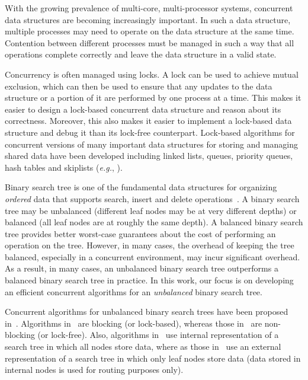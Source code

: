 With the growing prevalence of multi-core, multi-processor systems, concurrent data structures are becoming increasingly important. In such a data structure, multiple processes may need to operate on the data structure at the same time. Contention between different processes must be managed in such a way that all operations complete correctly and leave the data structure in a valid state.

Concurrency is often managed using locks. A lock can be used to achieve mutual exclusion, which can then be used to ensure that any updates to the data structure or a portion of it are performed by one process at a time. This makes it easier to design a lock-based concurrent data structure and reason about its correctness. Moreover, this also makes it easier to implement a lock-based data structure and debug it than its lock-free counterpart. Lock-based algorithms for concurrent versions of many important data structures for storing and managing shared data have been developed including linked lists, queues, priority queues, hash tables and skiplists (\emph{e.g.}, \cite{MicSco:1996:PODC, Mic:2002:SPAA,Lea:2003:JSR166,HelHer+:2005:OPODIS,LevHer+:2007:SIROCCO, HerSha:2012:Book}).

Binary search tree is one of the fundamental data structures for organizing \emph{ordered} data that supports search, insert and delete operations~\cite{CorLei+:1991:MIT}. A binary search tree may be unbalanced (different leaf nodes may be at very different depths) or balanced (all leaf nodes are at roughly the same depth). A balanced binary search tree provides better worst-case guarantees about the cost of performing an operation on the tree. However, in many cases, the overhead of keeping the tree balanced, especially in a concurrent environment, may incur significant overhead. As a result, in many cases, an unbalanced binary search tree  outperforms a balanced binary search tree in practice. In this work, our focus is on developing an efficient concurrent algorithms for an \emph{unbalanced} binary search tree. 

Concurrent algorithms for unbalanced binary search trees have been proposed in~\cite{EllFat+:2010:PODC,HowJon:2012:SPAA,NatMit:2014:PPoPP,DraVec+:2014:PPoPP,EllFat+:2014:PODC,ChaDan+:2014:PODC,ArbAtt:2014:PODC}. Algorithms in~\cite{DraVec+:2014:PPoPP,ArbAtt:2014:PODC} are blocking (or lock-based), whereas those in~\cite{EllFat+:2010:PODC,HowJon:2012:SPAA,NatMit:2014:PPoPP,EllFat+:2014:PODC,ChaDan+:2014:PODC} are non-blocking (or lock-free). Also, algorithms in~\cite{HowJon:2012:SPAA,DraVec+:2014:PPoPP,ArbAtt:2014:PODC,ChaDan+:2014:PODC} use internal representation of a search tree in which all nodes store data, where as those in~\cite{EllFat+:2010:PODC,NatMit:2014:PPoPP,EllFat+:2014:PODC} use an external representation of  a search tree in which only leaf nodes store data (data stored in internal nodes is used for routing purposes only).

